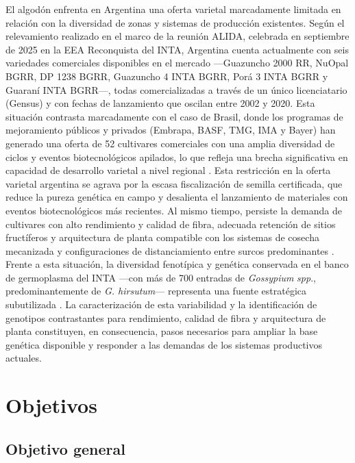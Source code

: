 \documentclass[12pt,oneside]{reedthesis}
\begin{document}
El algodón enfrenta en Argentina una oferta varietal marcadamente limitada en relación con la diversidad de zonas y sistemas de producción existentes. Según el relevamiento realizado en el marco de la reunión ALIDA, celebrada en septiembre de 2025 en la EEA Reconquista del INTA, Argentina cuenta actualmente con seis variedades comerciales disponibles en el mercado ---Guazuncho 2000 RR, NuOpal BGRR, DP 1238 BGRR, Guazuncho 4 INTA BGRR, Porá 3 INTA BGRR y Guaraní INTA BGRR---, todas comercializadas a través de un único licenciatario (Gensus) y con fechas de lanzamiento que oscilan entre 2002 y 2020. Esta situación contrasta marcadamente con el caso de Brasil, donde los programas de mejoramiento públicos y privados (Embrapa, BASF, TMG, IMA y Bayer) han generado una oferta de 52 cultivares comerciales con una amplia diversidad de ciclos y eventos biotecnológicos apilados, lo que refleja una brecha significativa en capacidad de desarrollo varietal a nivel regional \autocite{suassuna2025}. Esta restricción en la oferta varietal argentina se agrava por la escasa fiscalización de semilla certificada, que reduce la pureza genética en campo y desalienta el lanzamiento de materiales con eventos biotecnológicos más recientes. Al mismo tiempo, persiste la demanda de cultivares con alto rendimiento y calidad de fibra, adecuada retención de sitios fructíferos y arquitectura de planta compatible con los sistemas de cosecha mecanizada y configuraciones de distanciamiento entre surcos predominantes \autocite{paytas2013,scarpin2022}. Frente a esta situación, la diversidad fenotípica y genética conservada en el banco de germoplasma del INTA ---con más de 700 entradas de \emph{Gossypium} \emph{spp}., predominantemente de \emph{G. hirsutum}--- representa una fuente estratégica subutilizada \autocite{monteros2025}. La caracterización de esta variabilidad y la identificación de genotipos contrastantes para rendimiento, calidad de fibra y arquitectura de planta constituyen, en consecuencia, pasos necesarios para ampliar la base genética disponible y responder a las demandas de los sistemas productivos actuales.

\section{Objetivos}\label{objetivos}

\subsection{Objetivo general}\label{objetivo-general}
\end{document}
